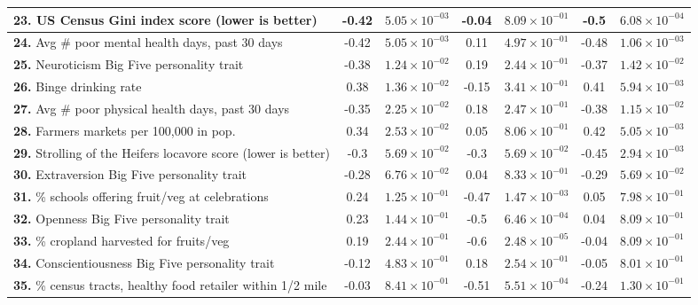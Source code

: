 \documentclass[10pt]{article}
\begin{document}
\begin{table*}
\begin{longtable}{|l|c|c|c|c|c|c|}
 \textbf{23.} US Census Gini index score \cite{gini} (lower is better) & -0.42 & $5.05\times 10^{-03}$ & -0.04 & $8.09\times 10^{-01}$ & -0.5 & $6.08\times 10^{-04}$ \\\hline
 \textbf{24.} Avg \# poor mental health days, past 30 days \cite{america} & -0.42 & $5.05\times 10^{-03}$ & 0.11 & $4.97\times 10^{-01}$ & -0.48 & $1.06\times 10^{-03}$ \\\hline \hline
 \textbf{25.} Neuroticism Big Five personality trait \cite{rentfrow} & -0.38 & $1.24\times 10^{-02}$ & 0.19 & $2.44\times 10^{-01}$ & -0.37 & $1.42\times 10^{-02}$ \\\hline
 \textbf{26.} Binge drinking rate \cite{america} & 0.38 & $1.36\times 10^{-02}$ & -0.15 & $3.41\times 10^{-01}$ & 0.41 & $5.94\times 10^{-03}$ \\\hline
 \textbf{27.} Avg \# poor physical health days, past 30 days \cite{america} & -0.35 & $2.25\times 10^{-02}$ & 0.18 & $2.47\times 10^{-01}$ & -0.38 & $1.15\times 10^{-02}$ \\\hline
 \textbf{28.} Farmers markets per 100,000 in pop. \cite{produce} &
 0.34 & $2.53\times 10^{-02}$ & 0.05 & $8.06\times 10^{-01}$ & 0.42 & $5.05\times 10^{-03}$ \\\hline \hline
 \textbf{29.} Strolling of the Heifers locavore score (lower is better) \cite{stroll} & -0.3 & $5.69\times 10^{-02}$ & -0.3 & $5.69\times 10^{-02}$ & -0.45 & $2.94\times 10^{-03}$ \\\hline
 \textbf{30.} Extraversion Big Five personality trait \cite{rentfrow} & -0.28 & $6.76\times 10^{-02}$ & 0.04 & $8.33\times 10^{-01}$ & -0.29 & $5.69\times 10^{-02}$ \\\hline
 \textbf{31.} \% schools offering fruit/veg at celebrations \cite{produce} & 0.24 & $1.25\times 10^{-01}$ & -0.47 & $1.47\times 10^{-03}$ & 0.05 & $7.98\times 10^{-01}$ \\\hline
 \textbf{32.} Openness Big Five personality trait \cite{rentfrow} & 0.23 & $1.44\times 10^{-01}$ & -0.5 & $6.46\times 10^{-04}$ & 0.04 & $8.09\times 10^{-01}$ \\\hline
 \textbf{33.} \% cropland harvested for fruits/veg \cite{produce} & 0.19 & $2.44\times 10^{-01}$ & -0.6 & $2.48\times 10^{-05}$ & -0.04 & $8.09\times 10^{-01}$ \\\hline
 \textbf{34.} Conscientiousness Big Five personality trait \cite{rentfrow} & -0.12 & $4.83\times 10^{-01}$ & 0.18 & $2.54\times 10^{-01}$ & -0.05 & $8.01\times 10^{-01}$ \\\hline
 \textbf{35.} \% census tracts, healthy food retailer within 1/2 mile \cite{produce} & -0.03 & $8.41\times 10^{-01}$ & -0.51 & $5.51\times 10^{-04}$ & -0.24 & $1.30\times 10^{-01}$ \\\hline

\end{longtable}
\end{table*}
\end{document}
